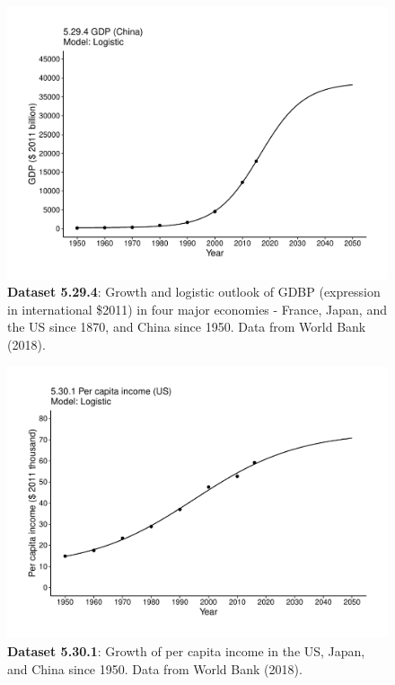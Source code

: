 \documentclass[aps,rmp,preprint,superscriptaddress,10pt,onecolumn]{article}
\begin{document}
\clearpage
\begin{figure}[h]
\includegraphics[width=\textwidth]{output/figs-ggplot/5.29.4.pdf}
\caption{\textbf{Dataset 5.29.4}: Growth and logistic outlook of GDBP (expression in international \$2011) in four major economies - France, Japan, and the US since 1870, and China since 1950. Data from World Bank (2018).}
\end{figure}
	
\clearpage
\begin{figure}[h]
\includegraphics[width=\textwidth]{output/figs-ggplot/5.30.1.pdf}
\caption{\textbf{Dataset 5.30.1}: Growth of per capita income in the US, Japan, and China since 1950. Data from World Bank (2018).}
\end{figure}
	
\end{document}
